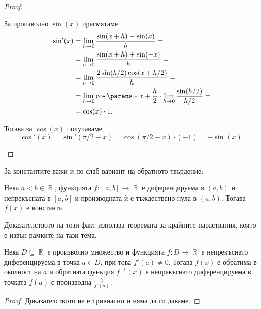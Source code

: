 \documentclass{../../common/topic}
\begin{document}
\begin{proof}
\begin{enumerate}
    За произволно \( \sin(x) \) пресмятаме
    \begin{align*}
      \sin'(x)
      &=
      \lim_{h \to 0} \frac {\sin(x+h) - \sin(x)} h
      = \\ &=
      \lim_{h \to 0} \frac {\sin(x+h) + \sin(-x)} h
      = \\ &=
      \lim_{h \to 0} \frac {2 \sin(h / 2) \cos(x+h/2)} h
      = \\ &=
      \lim_{h \to 0} \cos \parens*{x + \frac h 2 } \cdot \lim_{h \to 0} \frac {\sin(h / 2)} {h/2}
      = \\ &=
      \cos(x) \cdot 1.
    \end{align*}

    Тогава за \( \cos(x) \) получаваме
    \begin{equation*}
      \cos'(x) = \sin'(\pi / 2 - x) = \cos(\pi / 2 - x) \cdot (-1) = -\sin(x).
    \end{equation*}
  \end{enumerate}
\end{proof}

За константите важи и по-слаб вариант на обратното твърдение:
\begin{proposition}\label{thm:zero_derivative}
  Нека \( a < b \in \BbbR \), функцията \( f: [a, b] \to \BbbR \) е диференцируема в \( (a, b) \) и непрекъсната в \( [a, b] \) и производната ѝ е тъждествено нула в \( (a, b) \). Тогава \( f(x) \) е константа.
\end{proposition}
\begin{remark}
  Доказателството на този факт използва теоремата за крайните нараствания, която е извън рамките на тази тема.
\end{remark}

\begin{theorem}
  Нека \( D \subseteq \BbbR \) е произволно множество и функцията \( f: D \to \BbbR \) е непрекъснато диференцируема в точка \( a \in D \), при това \( f'(a) \neq 0 \). Тогава \( f(x) \) е обратима в околност на \( a \) и обратната функция \( f^{-1} (x) \) е непрекъснато диференцируема в точката \( f(a) \) с производна \( \frac 1 {f'(a)} \).
\end{theorem}
\begin{proof}
  Доказателството не е тривиално и няма да го даваме.
\end{proof}
\end{document}

